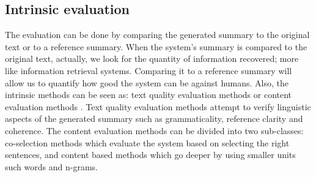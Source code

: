 \subsection{Intrinsic evaluation}

The evaluation can be done by comparing the generated summary to the original text or to a reference summary. 
When the system's summary is compared to the original text, actually, we look for the quantity of information recovered; more like information retrieval systems.
Comparing it to a reference summary will allow us to quantify how good the system can be against humans.
Also, the intrinsic methods can be seen as: text quality evaluation methods or content evaluation methods \citep{12-steinberger-jezek}.
Text quality evaluation methods attempt to verify linguistic aspects of the generated summary such as grammaticality, reference clarity and coherence. 
The content evaluation methods can be divided into two sub-classes: co-selection methods which evaluate the system based on selecting the right sentences, and content based methods which go deeper by using smaller units such words and n-grams.

